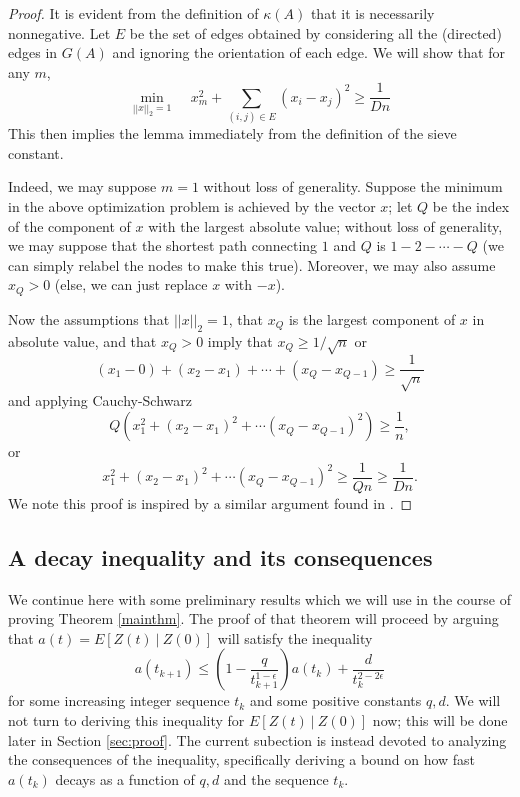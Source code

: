 \documentclass[final]{siamltex}
\begin{document}
\begin{proof} It is evident from the definition of $\kappa(A)$ that it is necessarily nonnegative. Let $E$ be the set of edges obtained by considering all the (directed) edges in $G(A)$ and ignoring the orientation of each edge. We will show that  for any $m$,  
\[ \min_{||x||_2=1} ~~~~~  x_m^2 + \sum_{(i,j) \in E} (x_i - x_j)^2 \geq \frac{1}{D n}  
\] This then implies the lemma immediately  from the definition of the sieve constant. 

Indeed, we may suppose $m=1$ without loss of generality. Suppose  the minimum in the above optimization problem is achieved by the vector $x$; let $Q$ be the index of the component of $x$ with 
the largest absolute value; without loss of generality, we may suppose that the shortest path connecting $1$ and $Q$ is $1-2-\cdots -Q$ (we can simply relabel the nodes to make this true). Moreover, we may also assume $x_Q > 0$ (else, we can just replace $x$ with $-x$). 

{{{Now the assumptions that $||x||_2=1$, that
$x_Q$ is the largest component of $x$ in absolute value, and  that $x_Q > 0$}}} imply that  $x_Q \geq 1/\sqrt{n}$ or
\[ (x_1-0) + (x_2 - x_1) + \cdots + (x_Q - x_{Q-1}) \geq \frac{1}{\sqrt{n}} \] and applying Cauchy-Schwarz
\[ Q ( x_1^2 + (x_2 - x_1)^2 + \cdots (x_Q - x_{Q-1})^2) \geq \frac{1}{n}, \] or 
\[ x_1^2 + (x_2 - x_1)^2 + \cdots (x_Q- x_{Q-1})^2 \geq \frac{1}{Qn} \geq \frac{1}{ D n}. \] We note this proof is inspired by a similar argument found in \cite{LO81}. \end{proof}

\subsection{A decay inequality and its consequences\label{subsec:decay}} We continue here with some preliminary results which we will use in the course of proving Theorem \ref{mainthm}. The proof of that theorem will proceed by arguing that $a(t)= E[Z(t) ~|~ Z(0)]$ will satisfy the inequality  
\begin{equation} \label{exampledecay} a(t_{k+1}) \leq  \left( 1 - \frac{q}{t_{k+1}^{1-\epsilon}} \right) a({t_k}) + \frac{d}{t_k^{2 - 2 \epsilon}} \end{equation} for some increasing integer sequence $t_k$ and some positive constants $q,d$. We will not turn to deriving this  inequality for $E[Z(t) ~|~ Z(0)]$ now; this will be done later in Section \ref{sec:proof}. The current subection is instead devoted to analyzing the consequences of the inequality, specifically deriving a bound on how fast $a(t_k)$ decays as a function of $q,d$ and the sequence $t_k$. 
\end{document}
